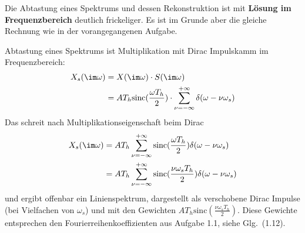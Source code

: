 \begin{Loesung}
\begin{center}
\end{center}
%
%
%

Die Abtastung eines Spektrums und dessen Rekonstruktion ist mit
\textbf{Lösung im Frequenzbereich} deutlich frickeliger.
Es ist im Grunde aber die gleiche Rechnung wie in der vorangegangenen Aufgabe.

Abtastung eines Spektrums ist Multiplikation mit Dirac Impulskamm im Frequenzbereich:
\begin{align}
X_s(\im\omega)
&= X(\im\omega) \cdot S(\im\omega)\\
&= A T_h\mathrm{sinc}(\frac{\omega T_h}{2}) \cdot \sum_{\nu=-\infty}^{+\infty} \delta(\omega-\nu \omega_s)
\end{align}
Das schreit nach Multiplikationseigenschaft beim Dirac
\begin{align}
X_s(\im\omega)
&= A T_h \sum_{\nu=-\infty}^{+\infty} \mathrm{sinc}(\frac{\omega T_h}{2}) \delta(\omega-\nu \omega_s)\\
&= A T_h \sum_{\nu=-\infty}^{+\infty} \mathrm{sinc}(\frac{\nu \omega_s T_h}{2}) \delta(\omega-\nu \omega_s)
\end{align}
und ergibt offenbar ein Linienspektrum, dargestellt als verschobene Dirac Impulse (bei Vielfachen von $\omega_s$)
und mit den Gewichten $A T_h \mathrm{sinc}(\frac{\nu \omega_s T_h}{2})$. Diese Gewichte
entsprechen den Fourierreihenkoeffizienten aus Aufgabe 1.1, siehe Glg.~(1.12).


\end{Loesung}
